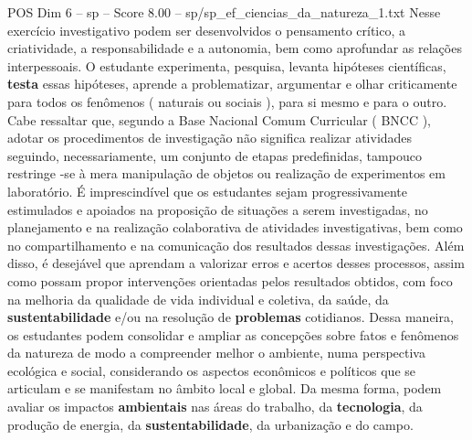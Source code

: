 \begin{textsample}{POS Dim 6 – sp – Score 8.00 – sp/sp\_ef\_ciencias\_da\_natureza\_1.txt}
Nesse exercício investigativo podem ser desenvolvidos o pensamento crítico, a criatividade, a responsabilidade e a autonomia, bem como aprofundar as relações interpessoais.
O estudante experimenta, pesquisa, levanta hipóteses científicas, \textbf{testa} essas hipóteses, aprende a problematizar, argumentar e olhar criticamente para todos os fenômenos ( naturais ou sociais ), para si mesmo e para o outro.
Cabe ressaltar que, segundo a Base Nacional Comum Curricular ( BNCC ), adotar os procedimentos de investigação não significa realizar atividades seguindo, necessariamente, um conjunto de etapas predefinidas, tampouco restringe -se à mera manipulação de objetos ou realização de experimentos em laboratório.
É imprescindível que os estudantes sejam progressivamente estimulados e apoiados na proposição de situações a serem investigadas, no planejamento e na realização colaborativa de atividades investigativas, bem como no compartilhamento e na comunicação dos resultados dessas investigações.
Além disso, é desejável que aprendam a valorizar erros e acertos desses processos, assim como possam propor intervenções orientadas pelos resultados obtidos, com foco na melhoria da qualidade de vida individual e coletiva, da saúde, da \textbf{sustentabilidade} e/ou na resolução de \textbf{problemas} cotidianos.
Dessa maneira, os estudantes podem consolidar e ampliar as concepções sobre fatos e fenômenos da natureza de modo a compreender melhor o ambiente, numa perspectiva ecológica e social, considerando os aspectos econômicos e políticos que se articulam e se manifestam no âmbito local e global.
Da mesma forma, podem avaliar os impactos \textbf{ambientais} nas áreas do trabalho, da \textbf{tecnologia}, da produção de energia, da \textbf{sustentabilidade}, da urbanização e do campo.

\end{textsample}
